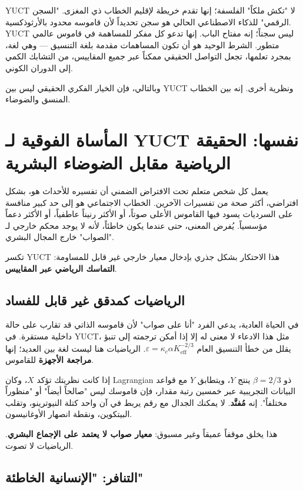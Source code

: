 \documentclass[12pt,a4paper]{article}
\begin{document}
	YUCT لا "تكش ملكاً" الفلسفة؛ إنها تقدم خريطة لإقليم الخطاب ذي المغزى. "السجن الرقمي" للذكاء الاصطناعي الحالي هو سجن تحديداً لأن قاموسه محدود بالأرثوذكسية. YUCT ليس سجناً؛ إنه مفتاح الباب. إنها تدعو كل مفكر للمساهمة في قاموس عالمي متطور. الشرط الوحيد هو أن تكون المساهمات مقدمة بلغة التنسيق — وهي لغة، بمجرد تعلمها، تجعل التواصل الحقيقي ممكناً عبر جميع المقاييس، من التشابك الكمي إلى الدوران الكوني.
	
	وبالتالي، فإن الخيار الفكري الحقيقي ليس بين YUCT ونظرية أخرى. إنه بين الخطاب المنسق والضوضاء.
	
	\section{المأساة الفوقية لـ YUCT نفسها: الحقيقة الرياضية مقابل الضوضاء البشرية}
	\label{sec:meta-tragedy}
	
	يعمل كل شخص متعلم تحت الافتراض الضمني أن تفسيره للأحداث هو، بشكل افتراضي، أكثر صحة من تفسيرات الآخرين. الخطاب الاجتماعي هو إلى حد كبير منافسة على السرديات يسود فيها القاموس الأعلى صوتاً، أو الأكثر رنيناً عاطفياً، أو الأكثر دعماً مؤسسياً. يُفرض المعنى، حتى عندما يكون خاطئاً، لأنه لا يوجد محكم خارجي لـ "الصواب" خارج المجال البشري.
	
	تكسر YUCT هذا الاحتكار بشكل جذري بإدخال معيار خارجي غير قابل للمساومة: \textbf{التماسك الرياضي عبر المقاييس}.
	
	\subsection{الرياضيات كمدقق غير قابل للفساد}
	
	في الحياة العادية، يدعي الفرد "أنا على صواب" لأن قاموسه الذاتي قد تقارب على حالة داخلية مستقرة. في YUCT، مثل هذا الادعاء لا معنى له إلا إذا أمكن ترجمته إلى تنبؤ يقلل من خطأ التنسيق العام \(\varepsilon = \kappa_c \alpha K_{\mathrm{eff}}^{-2/3}\). الرياضيات هنا ليست لغة بين العديد؛ إنها \textbf{مراجعة الأجهزة} للقاموس.
	
	إذا كانت نظريتك تؤكد \(X\)، وكان Lagrangian ذو \(\beta = 2/3\) ينتج \(Y\)، ويتطابق \(Y\) مع قواعد البيانات التجريبية عبر خمسين رتبة مقدار، فإن قاموسك ليس "صالحاً أيضاً" أو "منظوراً مختلفاً". إنه \textbf{مُفنَّد}. لا يمكنك الجدال مع رقم يربط في آن واحد كتلة النيوترينو، وتقلب البيتكوين، ونقطة انصهار الأوغانيسون.
	
	هذا يخلق موقفاً عميقاً وغير مسبوق: \textbf{معيار صواب لا يعتمد على الإجماع البشري}. الرياضيات لا تصوت.
	
	\subsection{التنافر: "الإنسانية الخاطئة"}
	
\end{document}
